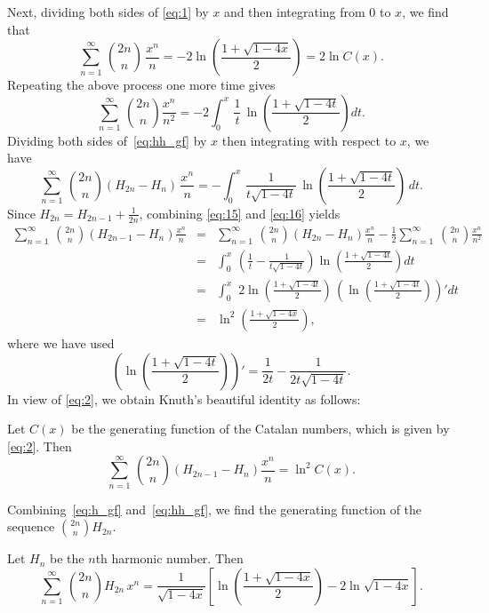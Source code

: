 \documentclass[12pt,reqno]{article}
\begin{document}
Next, dividing both sides of \eqref{eq:1} by $x$ and then integrating from $0$ to $x$, we find that
$$\sum_{n=1}^\infty\,\binom{2n}{n}\,\frac{x^n}{n} = -2 \ln\left(\frac{1+\sqrt{1- 4x}}{2}\right) = 2\ln C(x).$$
Repeating the above process one more time gives
\begin{equation}
\sum_{n=1}^\infty\,\binom{2n}{n}\frac{x^n}{n^2} = -2 \int_0^x\,\frac{1}{t}\,\ln\left(\frac{1+\sqrt{1- 4t}}{2}\right)dt.
\label{eq:15}
\end{equation}
Dividing both sides of~\eqref{eq:hh_gf} by $x$ then integrating with respect to $x$, we have
\begin{equation}
\sum_{n=1}^\infty\,\binom{2n}{n}(H_{2n} - H_n)\,\frac{x^n}{n} = - \int_0^x\,\frac{1}{t\sqrt{1-4t}}\,\ln\left(\frac{1+\sqrt{1 -4t}}{2}\right)\,dt.
\label{eq:16}
\end{equation}
Since $H_{2n} = H_{2n-1} + \frac{1}{2n}$, combining \eqref{eq:15}
and \eqref{eq:16} yields
\begin{eqnarray*}
\sum_{n=1}^\infty\,\binom{2n}{n}(H_{2n-1} - H_n)\frac{x^{n}}{n} & = & \sum_{n=1}^\infty\,\binom{2n}{n}(H_{2n} - H_n)\frac{x^{n}}{n} - \frac{1}{2}\sum_{n=1}^\infty\,\binom{2n}{n}\frac{x^{n}}{n^2}\\
& = & \int_0^x\,\left(\frac{1}{t} - \frac{1}{t\sqrt{1-4t}}\right)\ln\left(\frac{1+\sqrt{1 -4t}}{2}\right)dt\\
& = & \int_0^x\,\,2\ln\left(\frac{1+\sqrt{1 -4t}}{2}\right)\,\left(\ln\left(\frac{1+\sqrt{1 -4t}}{2}\right)\right)'dt\\
& =& \ln^2\left(\frac{1+\sqrt{1 -4x}}{2}\right),
\end{eqnarray*}
where we have used 
$$\left(\ln\left(\frac{1+\sqrt{1 -4t}}{2}\right)\right)' = \frac{1}{2t} - \frac{1}{2t\sqrt{1- 4t}}.$$
In view of \eqref{eq:2}, we obtain Knuth's beautiful identity as follows:

\begin{theorem} Let $C(x)$ be the generating function of the Catalan
numbers, which is given by \eqref{eq:2}. Then
\begin{equation}     
\sum_{n=1}^\infty\,\binom{2n}{n}(H_{2n-1} - H_n)\frac{x^{n}}{n} = \ln^2C(x).
\label{eq:k_gf}
\end{equation}
\end{theorem}

Combining~\eqref{eq:h_gf} and~\eqref{eq:hh_gf}, we find the generating function of the sequence $\binom{2n}{n}H_{2n}$.

\begin{theorem} Let $H_n$ be the $n$th harmonic number. Then
\begin{equation}   \label{eq:h2_gf}
\sum_{n=1}^\infty\,\binom{2n}{n}H_{2n}\,x^n =  \frac{1}{\sqrt{1-4x}}\left[\ln\left(\frac{1+\sqrt{1 -4x}}{2}\right) -2\ln\sqrt{1-4x}\right].
\end{equation}
\end{theorem}
\end{document}
